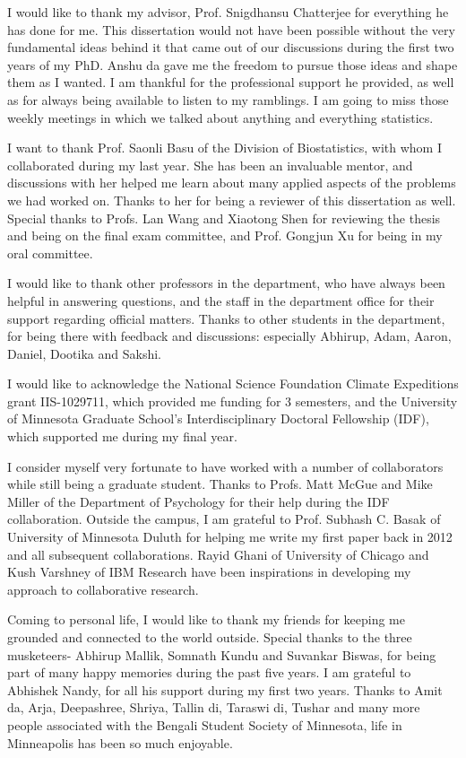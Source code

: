 I would like to thank my advisor, Prof. Snigdhansu Chatterjee for everything he has done for me. This dissertation would not have been possible without the very fundamental ideas behind it that came out of our discussions during the first two years of my PhD. Anshu da gave me the freedom to pursue those ideas and shape them as I wanted. I am thankful for the professional support he provided, as well as for always being available to listen to my ramblings. I am going to miss those weekly meetings in which we talked about anything and everything statistics.

I want to thank Prof. Saonli Basu of the Division of Biostatistics, with whom I collaborated during my last year. She has been an invaluable mentor, and discussions with her helped me learn about many applied aspects of the problems we had worked on. Thanks to her for being a reviewer of this dissertation as well. Special thanks to Profs. Lan Wang and Xiaotong Shen for reviewing the thesis and being on the final exam committee, and Prof. Gongjun Xu for being in my oral committee.

I would like to thank other professors in the department, who have always been helpful in answering questions, and the staff in the department office for their support regarding official matters. Thanks to other students in the department, for being there with feedback and discussions: especially Abhirup, Adam, Aaron, Daniel, Dootika and Sakshi.

I would like to acknowledge the National Science Foundation Climate Expeditions grant IIS-1029711, which provided me funding for 3 semesters, and the University of Minnesota Graduate School's Interdisciplinary Doctoral Fellowship (IDF), which supported me during my final year.

I consider myself very fortunate to have worked with a number of collaborators while still being a graduate student. Thanks to Profs. Matt McGue and Mike Miller of the Department of Psychology for their help during the IDF collaboration. Outside the campus, I am grateful to Prof. Subhash C. Basak of University of Minnesota Duluth for helping me write my first paper back in 2012 and all subsequent collaborations. Rayid Ghani of University of Chicago and Kush Varshney of IBM Research have been inspirations in developing my approach to collaborative research.

Coming to personal life, I would like to thank my friends for keeping me grounded and connected to the world outside. Special thanks to the three musketeers- Abhirup Mallik, Somnath Kundu and Suvankar Biswas, for being part of many happy memories during the past five years. I am grateful to Abhishek Nandy, for all his support during my first two years. Thanks to Amit da, Arja, Deepashree, Shriya, Tallin di, Taraswi di, Tushar and many more people associated with the Bengali Student Society of Minnesota, life in Minneapolis has been so much enjoyable.

